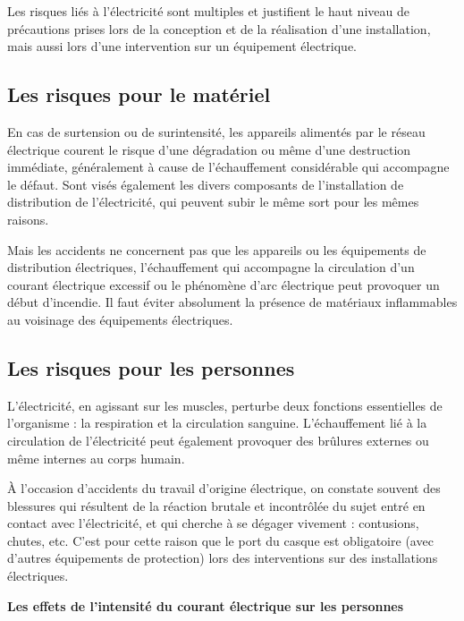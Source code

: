Les risques liés à l’électricité sont multiples et justifient le haut niveau de précautions prises lors de la conception et de la réalisation d’une installation, mais aussi lors d’une intervention sur un équipement électrique.



\subsection{Les risques pour le matériel}

En cas de surtension ou de surintensité, les appareils alimentés par le réseau électrique courent le risque d’une dégradation ou même d’une destruction immédiate, généralement à cause de l’échauffement considérable qui accompagne le défaut.
Sont visés également les divers composants de l’installation de distribution de l’électricité, qui peuvent subir le même sort pour les mêmes raisons.
\vspace{0.3cm}

Mais les accidents ne concernent pas que les appareils ou les équipements de distribution électriques, l’échauffement qui accompagne la circulation d’un courant électrique excessif ou le phénomène d’arc électrique peut provoquer un début d’incendie. Il faut éviter absolument la présence de matériaux inflammables au voisinage des équipements électriques.

\subsection{Les risques pour les personnes} 

L’électricité, en agissant sur les muscles, perturbe deux fonctions essentielles de l’organisme : la respiration et la circulation sanguine. L’échauffement lié à la circulation de l’électricité peut également provoquer des brûlures externes ou même internes au corps humain.
\vspace{0.3cm}

À l’occasion d’accidents du travail d’origine électrique, on constate souvent des blessures qui résultent de la réaction brutale et incontrôlée du sujet entré en contact avec l’électricité, et qui cherche à se dégager vivement : contusions, chutes, etc. C’est pour cette raison que le port du casque est obligatoire (avec d’autres équipements de protection) lors des interventions sur des installations électriques.


\vspace{0.3cm}
\textbf{Les effets de l’intensité du courant électrique sur les personnes}
\vspace{0.3cm}

